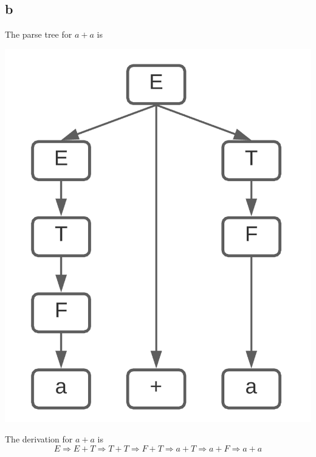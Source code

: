 \documentclass{article}
\begin{document}
\pagebreak

\subsection*{b}
The parse tree for $a+a$ is
\begin{center}
    \includegraphics[scale=.65]{21b.png}
\end{center}
The derivation for $a+a$ is
$$E \Rightarrow E+T \Rightarrow T+T \Rightarrow F+T \Rightarrow a + T \Rightarrow a + F \Rightarrow a + a$$

\pagebreak
\end{document}
